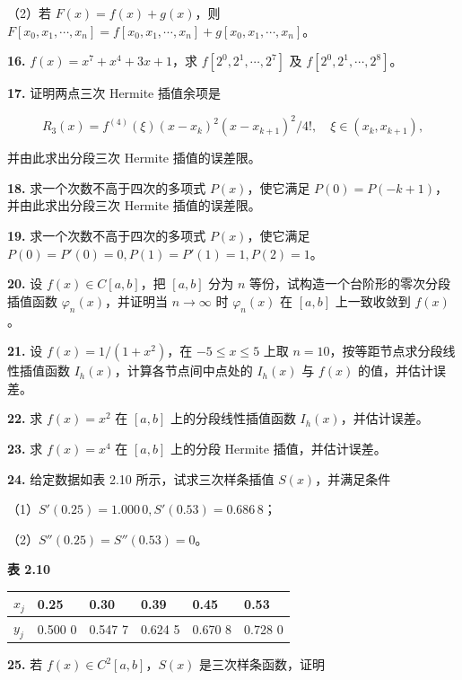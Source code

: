\documentclass[
  10pt,
  fontset=fandol]{ctexart}
\newcounter{none} %
\begin{document}
（2）若 \(F(x)=f(x)+g(x)\)，则 \(F[x_0,\allowbreak x_1,\allowbreak \cdots,\allowbreak x_n]=f[x_0,\allowbreak x_1,\allowbreak \cdots,\allowbreak x_n]+g[x_0,\allowbreak x_1,\allowbreak \cdots,\allowbreak x_n]\)。

\textbf{16.} \(f(x)=x^7+x^4+3x+1\)，求 \(f[2^0,2^1,\cdots,2^7]\) 及 \(f[2^0,2^1,\cdots,2^8]\)。

\textbf{17.} 证明两点三次 Hermite 插值余项是

\[R_3(x)=f^{(4)}(\xi)(x-x_k)^2(x-x_{k+1})^2/4!,\quad\xi\in(x_k,x_{k+1}),\]

并由此求出分段三次 Hermite 插值的误差限。

\textbf{18.} 求一个次数不高于四次的多项式 \(P(x)\)，使它满足 \(P(0)=P(-k+1)\)，并由此求出分段三次 Hermite 插值的误差限。

\textbf{19.} 求一个次数不高于四次的多项式 \(P(x)\)，使它满足 \(P(0)=P'(0)=0,P(1)=P'(1)=1,P(2)=1\)。

\textbf{20.} 设 \(f(x)\in C[a,b]\)，把 \([a,b]\) 分为 \(n\) 等份，试构造一个台阶形的零次分段插值函数 \(\varphi_n(x)\)，并证明当 \(n\to\infty\) 时 \(\varphi_n(x)\) 在 \([a,b]\) 上一致收敛到 \(f(x)\)。

\textbf{21.} 设 \(f(x)=1/(1+x^2)\)，在 \(-5\leqslant x\leqslant5\) 上取 \(n=10\)，按等距节点求分段线性插值函数 \(I_h(x)\)，计算各节点间中点处的 \(I_h(x)\) 与 \(f(x)\) 的值，并估计误差。

\textbf{22.} 求 \(f(x)=x^2\) 在 \([a,b]\) 上的分段线性插值函数 \(I_h(x)\)，并估计误差。

\textbf{23.} 求 \(f(x)=x^4\) 在 \([a,b]\) 上的分段 Hermite 插值，并估计误差。

\textbf{24.} 给定数据如表 2.10 所示，试求三次样条插值 \(S(x)\)，并满足条件

（1）\(S'(0.25)=1.000\,0,S'(0.53)=0.686\,8\)；

（2）\(S''(0.25)=S''(0.53)=0\)。

\textbf{表 2.10}

{\def\LTcaptype{none} %
\begin{longtable}[]{@{}llllll@{}}
\toprule\noalign{}
\(x_j\) & 0.25 & 0.30 & 0.39 & 0.45 & 0.53 \\
\midrule\noalign{}
\endhead
\bottomrule\noalign{}
\endlastfoot
\(y_j\) & 0.500 0 & 0.547 7 & 0.624 5 & 0.670 8 & 0.728 0 \\
\end{longtable}
}

\textbf{25.} 若 \(f(x)\in C^2[a,b]\)，\(S(x)\) 是三次样条函数，证明
\end{document}
